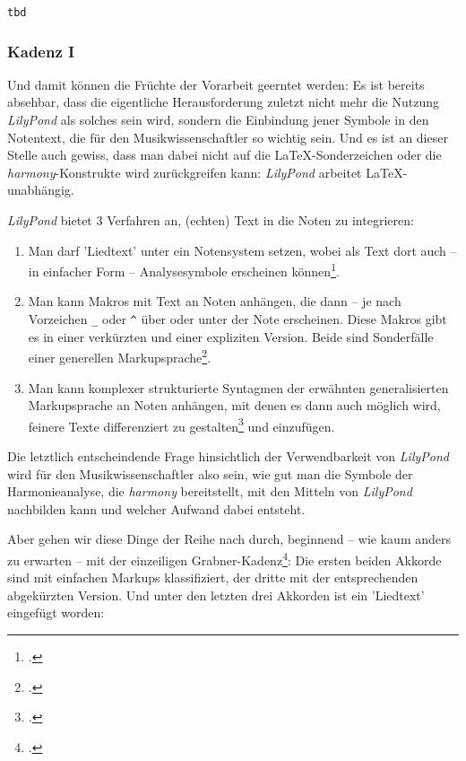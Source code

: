 \begin{verbatim}
tbd
\end{verbatim}


\subsubsection{Kadenz I}

Und damit können die Früchte der Vorarbeit geerntet werden: Es ist bereits
absehbar, dass die eigentliche Herausforderung zuletzt nicht mehr die Nutzung
\emph{LilyPond} als solches sein wird, sondern die Einbindung jener Symbole in
den Notentext, die für den Musikwissenschaftler so wichtig sein. Und es ist an
dieser Stelle auch gewiss, dass man dabei nicht auf die \LaTeX-Sonderzeichen
oder die \emph{harmony}-Konstrukte wird zurückgreifen kann: \emph{LilyPond}
arbeitet \LaTeX-unabhängig.

\emph{LilyPond} bietet 3 Verfahren an, (echten) Text in die Noten zu integrieren:

\begin{enumerate}
  \item Man darf 'Liedtext' unter ein Notensystem setzen, wobei als Text dort
  auch -- in einfacher Form  -- Analysesymbole erscheinen
  können\footcite[vgl.][31ff]{LilyPond2018b}.
  \item Man kann Makros mit Text an Noten anhängen, die dann -- je nach
  Vorzeichen \texttt{\_} oder \texttt{\^} über oder unter der Note erscheinen. Diese
  Makros gibt es in einer verkürzten und einer expliziten Version. Beide sind
  Sonderfälle einer generellen Markupsprache\footcite[vgl.][211ff]{LilyPond2018c}.
  \item Man kann komplexer strukturierte Syntagmen der erwähnten generalisierten
  Markupsprache an Noten anhängen, mit denen es dann auch möglich wird, feinere
  Texte differenziert zu gestalten\footcite[vgl.][218ff]{LilyPond2018c} und
  einzufügen.
\end{enumerate}

Die letztlich entscheindende Frage hinsichtlich der Verwendbarkeit von
\emph{LilyPond} wird für den Musikwissenschaftler also sein, wie gut man die
Symbole der Harmonieanalyse, die \emph{harmony} bereitstellt, mit den Mitteln
von \emph{LilyPond} nachbilden kann und welcher Aufwand dabei entsteht.

Aber gehen wir diese Dinge der Reihe nach durch, beginnend -- wie kaum anders zu
erwarten -- mit der einzeiligen
Grabner-Kadenz\footcite[vgl.][107]{Grabner1974a}: Die ersten beiden Akkorde sind
mit einfachen Markups klassifiziert, der dritte mit der entsprechenden
abgekürzten Version. Und unter den letzten drei Akkorden ist ein 'Liedtext'
eingefügt worden:

